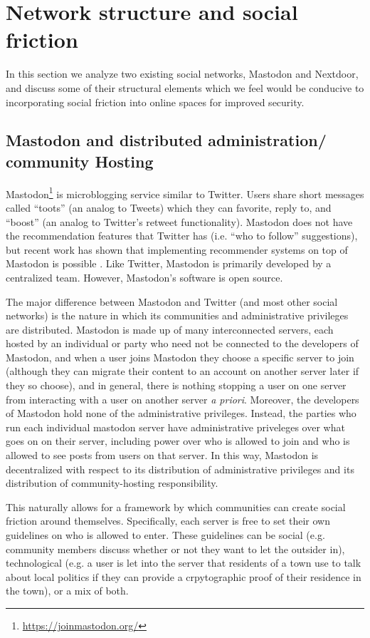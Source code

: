 \documentclass[sigconf,authordraft]{acmart}
\begin{document}
\section{Network structure and social friction}

In this section we analyze two existing social networks, Mastodon and Nextdoor, and discuss some of their structural elements which we feel would be conducive to incorporating social friction into online spaces for improved security.

\subsection{Mastodon and distributed administration/ community Hosting}

Mastodon\footnote{\url{https://joinmastodon.org/}} is microblogging service similar to Twitter. Users share short messages called ``toots'' (an analog to Tweets) which they can favorite, reply to, and ``boost'' (an analog to Twitter's retweet functionality). Mastodon does not have the recommendation features that Twitter has (i.e. ``who to follow'' suggestions), but recent work has shown that implementing recommender systems on top of Mastodon is possible \cite{trienes2018recommending}. Like Twitter, Mastodon is primarily developed by a centralized team. However, Mastodon's software is open source.

The major difference between Mastodon and Twitter (and most other social networks) is the nature in which its communities and administrative privileges are distributed. Mastodon is made up of many interconnected servers, each hosted by an individual or party who need not be connected to the developers of Mastodon, and when a user joins Mastodon they choose a specific server to join (although they can migrate their content to an account on another server later if they so choose), and in general, there is nothing stopping a user on one server from interacting with a user on another server {\itshape a priori}. Moreover, the developers of Mastodon hold none of the administrative privileges. Instead, the parties who run each individual mastodon server have administrative priveleges over what goes on on their server, including power over who is allowed to join and who is allowed to see posts from users on that server. In this way, Mastodon is decentralized with respect to its distribution of administrative privileges and its distribution of community-hosting responsibility.

This naturally allows for a framework by which communities can create social friction around themselves. Specifically, each server is free to set their own guidelines on who is allowed to enter. These guidelines can be social (e.g. community members discuss whether or not they want to let the outsider in), technological (e.g. a user is let into the server that residents of a town use to talk about local politics if they can provide a crpytographic proof of their residence in the town), or a mix of both. 
\end{document}
